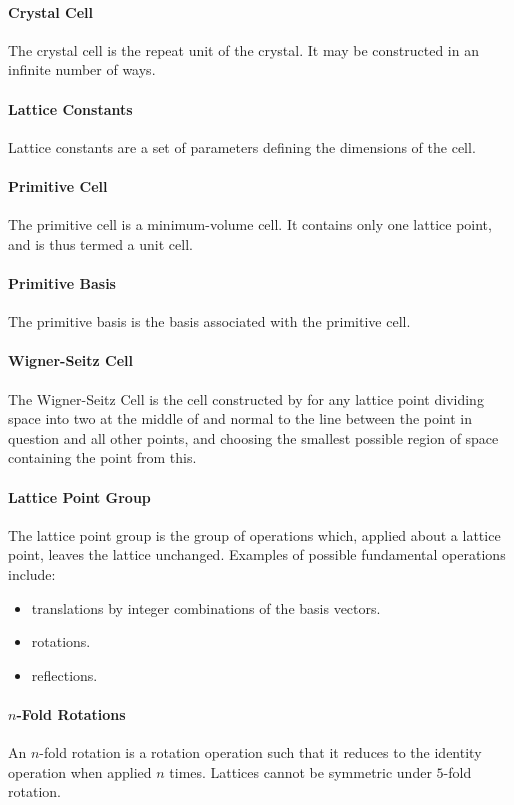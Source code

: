 \paragraph{Crystal Cell}
The crystal cell is the repeat unit of the crystal. It may be constructed in an infinite number of ways.

\paragraph{Lattice Constants}
Lattice constants are a set of parameters defining the dimensions of the cell.

\paragraph{Primitive Cell}
The primitive cell is a minimum-volume cell. It contains only one lattice point, and is thus termed a unit cell.

\paragraph{Primitive Basis}
The primitive basis is the basis associated with the primitive cell.

\paragraph{Wigner-Seitz Cell}
The Wigner-Seitz Cell is the cell constructed by for any lattice point dividing space into two at the middle of and normal to the line between the point in question and all other points, and choosing the smallest possible region of space containing the point from this.

\paragraph{Lattice Point Group}
The lattice point group is the group of operations which, applied about a lattice point, leaves the lattice unchanged. Examples of possible fundamental operations include:
\begin{itemize}
	\item translations by integer combinations of the basis vectors.
	\item rotations.
	\item reflections.
\end{itemize}

\paragraph{$n$-Fold Rotations}
An $n$-fold rotation is a rotation operation such that it reduces to the identity operation when applied $n$ times. Lattices cannot be symmetric under $5$-fold rotation.

